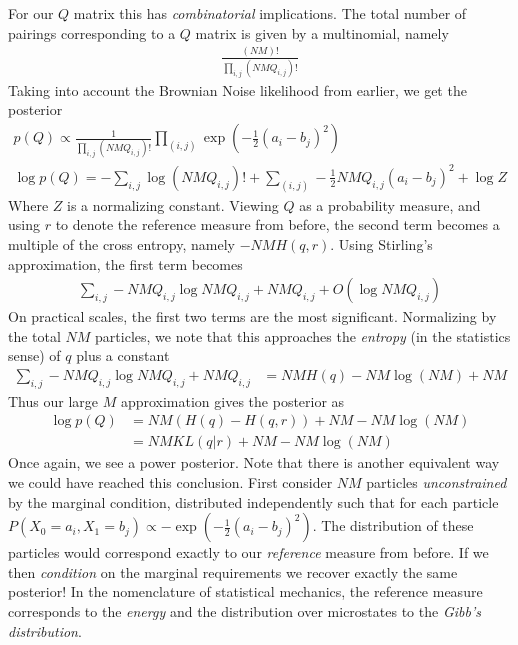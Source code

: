 \documentclass{article}
\begin{document}
For our $Q$ matrix this has \emph{combinatorial}
implications. The total number of pairings corresponding to a $Q$ matrix is
given by a multinomial, namely
\begin{align}
    \frac{(NM)!}{\prod_{i,j} (NMQ_{i,j})!}
\end{align}
Taking into account
the Brownian Noise likelihood from earlier, we get the posterior
\begin{align}
    p(Q) \propto \frac{1}{\prod_{i,j} (NMQ_{i,j})!}\prod_{(i,j)} \exp\left(-\frac 1 2(a_i-b_j)^2\right) \\
    \log p(Q) = - \sum_{i,j} \log (NMQ_{i,j})! + \sum_{(i,j)} - \frac 1 2 NMQ_{i,j}(a_i - b_j)^2 + \log Z
\end{align}
Where $Z$ is a normalizing constant. Viewing $Q$ as a probability measure, and using $r$
to denote the reference measure from before, the second term becomes a multiple
of the cross entropy, namely $- NM H(q,r)$.
Using Stirling's approximation, the first term becomes 
\begin{align}
    \sum_{i,j} - NMQ_{i,j} \log NMQ_{i,j} + NMQ_{i,j} + O(\log NMQ_{i,j})
\end{align}
On practical scales, the first two terms are the most significant.
Normalizing by the total $NM$ particles,
we note that this approaches the \emph{entropy} (in the statistics sense) of 
$q$ plus a constant
\begin{align}
    \sum_{i,j} -NMQ_{i,j} \log NMQ_{i,j} + NMQ_{i,j} &=
        NM H(q) - NM \log (NM) + NM
\end{align}
Thus our large $M$ approximation gives the posterior as 
\begin{align}
    \log p(Q) &= NM (H(q) - H(q,r)) + NM - NM \log (NM) \\
    &= NM KL(q | r) +  NM - NM \log (NM)
\end{align}
Once again, we see a power posterior. Note that there is another equivalent way we could
have reached this conclusion. First consider $NM$ particles
\emph{unconstrained} by the marginal condition, distributed independently such
that for each particle $P(X_0 = a_i, X_1 = b_j) \propto -\exp\left(-\frac 1 2 (a_i - b_j)^2 \right)$.
The distribution of these particles would correspond exactly to our
\emph{reference} measure from before. If we then \emph{condition} on the marginal
requirements we recover exactly the same posterior! In the nomenclature of
statistical mechanics, the reference measure corresponds to the \emph{energy}
and the distribution over microstates to the \emph{Gibb's distribution}.
\end{document}
